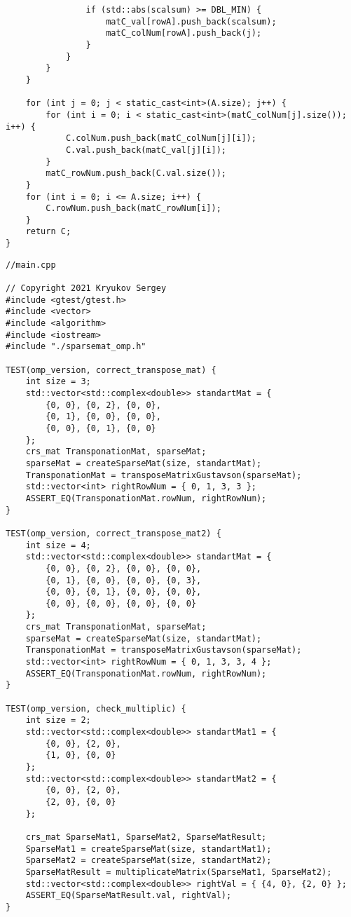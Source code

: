 \documentclass{report}
\begin{document}
\begin{lstlisting}
                if (std::abs(scalsum) >= DBL_MIN) {
                    matC_val[rowA].push_back(scalsum);
                    matC_colNum[rowA].push_back(j);
                }
            }
        }
    }

    for (int j = 0; j < static_cast<int>(A.size); j++) {
        for (int i = 0; i < static_cast<int>(matC_colNum[j].size()); i++) {
            C.colNum.push_back(matC_colNum[j][i]);
            C.val.push_back(matC_val[j][i]);
        }
        matC_rowNum.push_back(C.val.size());
    }
    for (int i = 0; i <= A.size; i++) {
        C.rowNum.push_back(matC_rowNum[i]);
    }
    return C;
}
\end{lstlisting}
\begin{lstlisting}
//main.cpp

// Copyright 2021 Kryukov Sergey
#include <gtest/gtest.h>
#include <vector>
#include <algorithm>
#include <iostream>
#include "./sparsemat_omp.h"

TEST(omp_version, correct_transpose_mat) {
    int size = 3;
    std::vector<std::complex<double>> standartMat = {
        {0, 0}, {0, 2}, {0, 0},
        {0, 1}, {0, 0}, {0, 0},
        {0, 0}, {0, 1}, {0, 0}
    };
    crs_mat TransponationMat, sparseMat;
    sparseMat = createSparseMat(size, standartMat);
    TransponationMat = transposeMatrixGustavson(sparseMat);
    std::vector<int> rightRowNum = { 0, 1, 3, 3 };
    ASSERT_EQ(TransponationMat.rowNum, rightRowNum);
}

TEST(omp_version, correct_transpose_mat2) {
    int size = 4;
    std::vector<std::complex<double>> standartMat = {
        {0, 0}, {0, 2}, {0, 0}, {0, 0},
        {0, 1}, {0, 0}, {0, 0}, {0, 3},
        {0, 0}, {0, 1}, {0, 0}, {0, 0},
        {0, 0}, {0, 0}, {0, 0}, {0, 0}
    };
    crs_mat TransponationMat, sparseMat;
    sparseMat = createSparseMat(size, standartMat);
    TransponationMat = transposeMatrixGustavson(sparseMat);
    std::vector<int> rightRowNum = { 0, 1, 3, 3, 4 };
    ASSERT_EQ(TransponationMat.rowNum, rightRowNum);
}

TEST(omp_version, check_multiplic) {
    int size = 2;
    std::vector<std::complex<double>> standartMat1 = {
        {0, 0}, {2, 0},
        {1, 0}, {0, 0}
    };
    std::vector<std::complex<double>> standartMat2 = {
        {0, 0}, {2, 0},
        {2, 0}, {0, 0}
    };

    crs_mat SparseMat1, SparseMat2, SparseMatResult;
    SparseMat1 = createSparseMat(size, standartMat1);
    SparseMat2 = createSparseMat(size, standartMat2);
    SparseMatResult = multiplicateMatrix(SparseMat1, SparseMat2);
    std::vector<std::complex<double>> rightVal = { {4, 0}, {2, 0} };
    ASSERT_EQ(SparseMatResult.val, rightVal);
}


\end{lstlisting}
\end{document}

